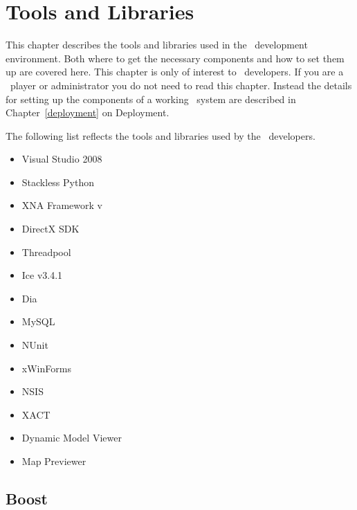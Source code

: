 %

\chapter{Tools and Libraries}
\label{toolslibraries}

This chapter describes the tools and libraries used in the \VTank\ development environment. Both where to get the necessary components and how to set them up are covered here. This chapter is only of interest to \VTank\ developers. If you are a \VTank\ player or administrator you do not need to read this chapter. Instead the details for setting up the components of a working \VTank\ system are described in Chapter~\ref{deployment} on Deployment.

The following list reflects the tools and libraries used by the \VTank\ developers. 

\begin{itemize}
\item Visual Studio 2008
\item Stackless Python
\item XNA Framework v\XNAVersion
\item DirectX SDK \DirectXSDKVersion
\item Threadpool \cite{threadpool}
\item Ice v3.4.1 \cite{ice}
\item Dia \cite{dia}
\item MySQL
\item NUnit
\item xWinForms
\item NSIS
\item XACT
\item Dynamic Model Viewer
\item Map Previewer
\end{itemize}

\section{Boost}

